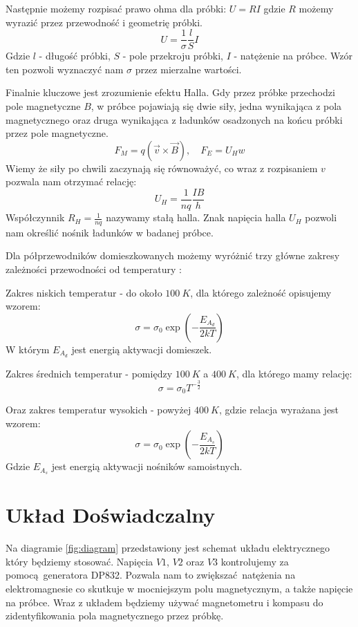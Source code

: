 \documentclass[12pt]{article}
\begin{document}
Następnie możemy rozpisać prawo ohma dla próbki: $U=RI$ gdzie $R$ możemy wyrazić przez przewodność i geometrię próbki.
\begin{equation}
    U = \frac{1}{\sigma} \frac{l}{S} I
    \label{eq:ohm_law}
\end{equation}
Gdzie $l$ - długość próbki, $S$ - pole przekroju próbki, $I$ - natężenie na próbce. Wzór ten pozwoli wyznaczyć nam $\sigma$ przez mierzalne wartości.

Finalnie kluczowe jest zrozumienie efektu Halla. Gdy przez próbke przechodzi pole magnetyczne $B$, w próbce pojawiają się dwie siły, 
jedna wynikająca z pola magnetycznego oraz druga wynikająca z ładunków osadzonych na końcu próbki przez pole magnetyczne.
\[
    F_M = q(\vec{v} \times \vec{B}), \quad F_E = U_H w
\]
Wiemy że siły po chwili zaczynają się równoważyć, co wraz z rozpisaniem $v$ pozwala nam otrzymać relację:
\begin{equation}
    U_H = \frac{1}{nq}\frac{IB}{h}
    \label{eq:hall_voltage}
\end{equation}
Współczynnik $R_H = \frac{1}{nq}$ nazywamy stałą halla. Znak napięcia halla $U_H$ pozwoli nam określić nośnik ładunków w badanej próbce.

Dla półprzewodników domieszkowanych możemy wyróżnić trzy główne zakresy zależności przewodności od temperatury \cite{skrypt}:

Zakres niskich temperatur - do około $100 \ K$, dla którego zależność opisujemy wzorem:
\[
    \sigma = \sigma_0 \exp{(-\frac{E_{A_d}}{2kT})}
\]
W którym $E_{A_d}$ jest energią aktywacji domieszek.

Zakres średnich temperatur - pomiędzy $100 \ K$ a $400 \ K$, dla którego mamy relację:
\[
    \sigma = \sigma_0 T^{-\frac{3}{2}}
\]

Oraz zakres temperatur wysokich - powyżej $400 \ K$, gdzie relacja wyrażana jest wzorem:
\begin{equation}
    \sigma = \sigma_0 \exp{(-\frac{E_{A_s}}{2kT})}
    \label{eq:high_temp}
\end{equation}
Gdzie $E_{A_s}$ jest energią aktywacji nośników samoistnych.

\section{Układ Doświadczalny}

Na diagramie \ref{fig:diagram} przedstawiony jest schemat układu elektrycznego który będziemy stosować.
Napięcia $V1$, $V2$ oraz $V3$ kontrolujemy za pomocą generatora DP832. 
Pozwala nam to zwiększać natężenia na elektromagnesie co skutkuje w mocniejszym polu magnetycznym, a także napięcie na próbce.
Wraz z układem będziemy używać magnetometru i kompasu do zidentyfikowania pola magnetycznego przez próbkę.
\end{document}
